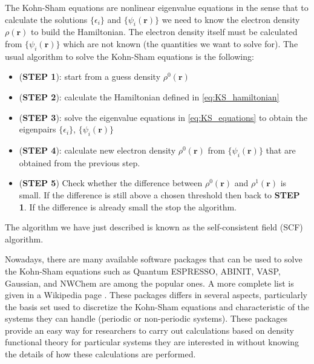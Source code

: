 The Kohn-Sham equations are nonlinear eigenvalue equations in the sense that to calculate the
solutions $\{\epsilon_{i}\}$ and $\{\psi_{i}(\mathbf{r})\}$ we need to know
the electron density $\rho(\mathbf{r})$ to build the Hamiltonian. The electron density
itself must be calculated from $\{\psi_{i}(\mathbf{r})\}$ which are not known (the quantities
we want to solve for). The usual algorithm to solve the Kohn-Sham equations is the following:
\begin{itemize}
\item (\textbf{STEP 1}): start from a guess density $\rho^{0}(\mathbf{r})$
\item (\textbf{STEP 2}): calculate the Hamiltonian defined in \eqref{eq:KS_hamiltonian}
\item (\textbf{STEP 3}): solve the eigenvalue equations in \eqref{eq:KS_equations} to obtain the eigenpairs
  $\{\epsilon_{i}\}$, $\{\psi_{i}(\mathbf{r})\}$
\item (\textbf{STEP 4}): calculate new electron density $\rho^{0}(\mathbf{r})$
  from $\{\psi_{i}(\mathbf{r})\}$
  that are obtained from the previous step.
\item (\textbf{STEP 5}) Check whether the difference between $\rho^{0}(\mathbf{r})$
  and $\rho^{1}(\mathbf{r})$ is small.
  If the difference is still above a chosen threshold then back to \textbf{STEP 1}.
  If the difference is already small the stop the algorithm.
\end{itemize}
The algorithm we have just described is known as the self-consistent field (SCF) algorithm.

Nowadays, there are many available software packages that can be used to solve the Kohn-Sham
equations such as Quantum ESPRESSO, ABINIT, VASP, Gaussian, and NWChem are among the
popular ones. A more complete list is given in a Wikipedia page \cite{wiki-dft-softwares}.
These packages differs in several aspects, particularly the basis set used to discretize
the Kohn-Sham equations and characteristic of the systems they can handle (periodic or non-periodic
systems). These packages provide an easy way for researchers to carry out calculations based
on density functional theory for particular systems they are interested in without knowing the
details of how these calculations are performed.

